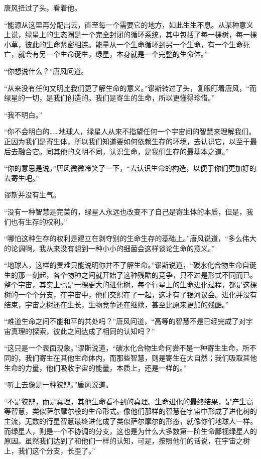 唐风扭过了头，看着他。

“能源从这里再分配出去，直至每一个需要它的地方，如此生生不息。从某种意义上说，绿星上的生态圈是一个完全封闭的循环系统，其中包括了每一棵树，每一棵小草，彼此的生命紧密相连。能量从一个生命循环到另一个生命，有一个生命死亡，就会有另一个生命诞生，绿星，本身就是一个完整的生命体。”

“你想说什么？”唐风问道。

“从来没有任何文明比我们更了解生命的意义。”谬斯转过了头，复眼盯着唐风，“而绿星的一切，是我们创造的。我们是寄生的生命，所以更懂得珍惜。”

“我不明白。”

“你不会明白的……地球人，绿星人从来不指望任何一个宇宙间的智慧来理解我们。正因为我们是寄生体，所以我们知道要如何依赖生存的环境，去认识它，以至于最后去融合它。同其他的文明不同，认识生命，是我们生存的最基本之道。”

“你的意思是说，”唐风微微冷笑了一下，“去认识生命的构造，以便于你们更加好的去寄生吧。”

谬斯并没有生气。

“没有一种智慧是完美的，绿星人永远也改变不了自己是寄生体的本质，但是，我们也有生存的权利。”

“哪怕这种生存的权利是建立在剥夺别的生命生存的基础上。”唐风说道，“多么伟大的论调啊，我从来没有想到一种小小的细菌会这样谈论生命的意义。”

“地球人，这样的责难只能说明你并不了解生命。”谬斯说道，“碳水化合物生命自诞生的那一刻起，各个物种之间就开始了这种残酷的竞争，只不过是形式不同而已。整个宇宙，其实上也是一棵更大的进化树，每个行星上的生命进化过程，都是这棵树的一个个分支，在宇宙中，他们交织在了一起，这才有了银河议会。进化并没有结束，宇宙之树还在生长，生物竞争还在继续，甚至比原来更加的残酷。”

“难道生命之间不能和平的共处吗？”唐风问道，“高等的智慧不是已经完成了对宇宙真理的探索，彼此之间达成了相同的认知吗？”

“这只是一个表面现象。”谬斯说道，“碳水化合物生命何尝不是一种寄生生命，所不同的，我们寄生在其他生命体内，而那些智慧，则是寄生在大自然；我们吸取其他生命的力量，他们吸收宇宙的能量，本质上，还是一样的。”

“听上去像是一种狡辩。”唐风说道。

“不是狡辩，而是真理，其他生命看不到的真理。生命进化的最终结果，是产生高等智慧，类似萨尔摩尔般的生命形式。像他们那样的智慧在宇宙中形成了进化树的主流，无数的行星智慧最终进化成了类似萨尔摩尔的形态，就像你们地球人一样。而绿星人，则是一个不协调的分支，这也是为什么大多数第一阶生命鄙视绿星人的原因。虽然我们达到了和他们一样的认知，可是，按照他们的话说，在宇宙之树上，我们这个分支，长歪了。”

